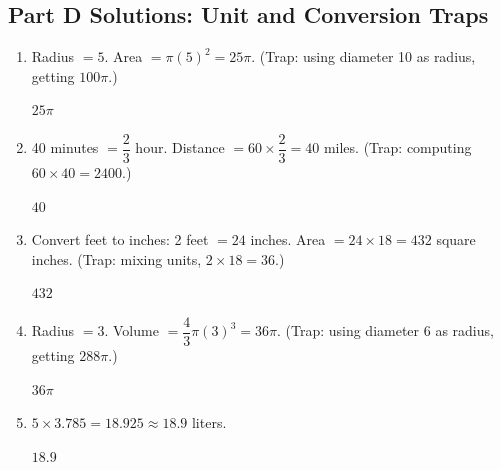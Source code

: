 \documentclass[14pt]{extarticle}
\begin{document}
\subsection*{Part D Solutions: Unit and Conversion Traps}
\begin{enumerate}
  \item Radius \(= 5\). Area \(= \pi(5)^2 = 25\pi\). (Trap: using diameter 10 as radius, getting \(100\pi\).)

  \(\boxed{25\pi}\)

  \item 40 minutes \(= \dfrac{2}{3}\) hour. Distance \(= 60 \times \dfrac{2}{3} = 40\) miles. (Trap: computing \(60 \times 40 = 2400\).)

  \(\boxed{40}\)

  \item Convert feet to inches: 2 feet \(= 24\) inches. Area \(= 24 \times 18 = 432\) square inches. (Trap: mixing units, \(2 \times 18 = 36\).)

  \(\boxed{432}\)

  \item Radius \(= 3\). Volume \(= \dfrac{4}{3}\pi(3)^3 = 36\pi\). (Trap: using diameter 6 as radius, getting \(288\pi\).)

  \(\boxed{36\pi}\)

  \item \(5 \times 3.785 = 18.925 \approx 18.9\) liters.

  \(\boxed{18.9}\)
\end{enumerate}
\end{document}
